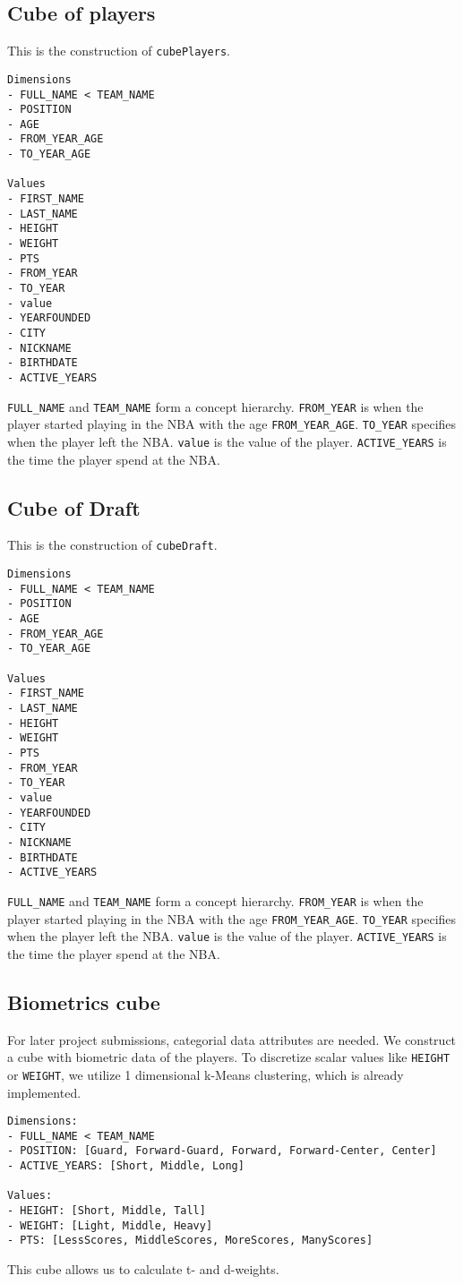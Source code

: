 \documentclass{article}
\begin{document}
\subsection{Cube of players}
This is the construction of \texttt{cubePlayers}.
\begin{lstlisting}
Dimensions
- FULL_NAME < TEAM_NAME
- POSITION
- AGE
- FROM_YEAR_AGE
- TO_YEAR_AGE

Values
- FIRST_NAME
- LAST_NAME
- HEIGHT
- WEIGHT
- PTS
- FROM_YEAR
- TO_YEAR
- value
- YEARFOUNDED
- CITY
- NICKNAME
- BIRTHDATE
- ACTIVE_YEARS
\end{lstlisting}
\texttt{FULL\_NAME} and \texttt{TEAM\_NAME} form a concept hierarchy.
\texttt{FROM\_YEAR} is when the player started playing in the NBA with the age \texttt{FROM\_YEAR\_AGE}.
\texttt{TO\_YEAR} specifies when the player left the NBA.
\texttt{value} is the value of the player.
\texttt{ACTIVE\_YEARS} is the time the player spend at the NBA.


\subsection{Cube of Draft}
This is the construction of \texttt{cubeDraft}.
\begin{lstlisting}
Dimensions
- FULL_NAME < TEAM_NAME
- POSITION
- AGE
- FROM_YEAR_AGE
- TO_YEAR_AGE

Values
- FIRST_NAME
- LAST_NAME
- HEIGHT
- WEIGHT
- PTS
- FROM_YEAR
- TO_YEAR
- value
- YEARFOUNDED
- CITY
- NICKNAME
- BIRTHDATE
- ACTIVE_YEARS
\end{lstlisting}
\texttt{FULL\_NAME} and \texttt{TEAM\_NAME} form a concept hierarchy.
\texttt{FROM\_YEAR} is when the player started playing in the NBA with the age \texttt{FROM\_YEAR\_AGE}.
\texttt{TO\_YEAR} specifies when the player left the NBA.
\texttt{value} is the value of the player.
\texttt{ACTIVE\_YEARS} is the time the player spend at the NBA.

\subsection{Biometrics cube}
For later project submissions, categorial data attributes are needed.
We construct a cube with biometric data of the players.
To discretize scalar values like \texttt{HEIGHT} or \texttt{WEIGHT}, we utilize 1 dimensional k-Means clustering, which is already implemented.
\begin{lstlisting}
Dimensions:
- FULL_NAME < TEAM_NAME
- POSITION: [Guard, Forward-Guard, Forward, Forward-Center, Center]
- ACTIVE_YEARS: [Short, Middle, Long]

Values:
- HEIGHT: [Short, Middle, Tall]
- WEIGHT: [Light, Middle, Heavy]
- PTS: [LessScores, MiddleScores, MoreScores, ManyScores]
\end{lstlisting}
This cube allows us to calculate t- and d-weights.
\end{document}
